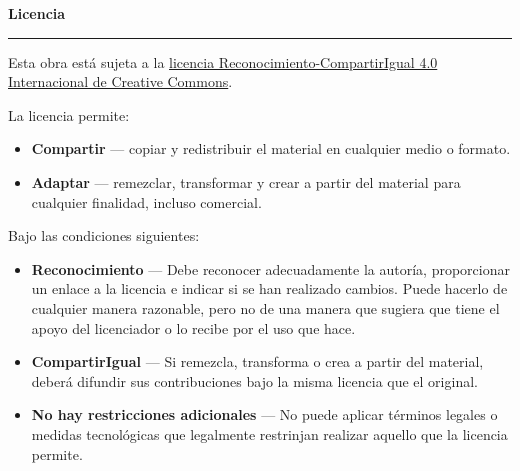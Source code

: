 \thispagestyle{empty}

\hfill

\vfill

\textbf{Licencia} %
\par\vspace*{\dimexpr-\parskip-\baselineskip+6pt}
\noindent\rule{\textwidth}{0.5pt}

Esta obra está sujeta a la \hyperlink{https://creativecommons.org/licenses/by-sa/4.0/legalcode}{licencia Reconocimiento-CompartirIgual 4.0 Internacional de Creative Commons}.

La licencia permite:
\begin{itemize}
	\item[] \textbf{Compartir} --- copiar y redistribuir el material en cualquier medio o formato.
	\item[] \textbf{Adaptar} --- remezclar, transformar y crear a partir del material
para cualquier finalidad, incluso comercial.
\end{itemize}

Bajo las condiciones siguientes:
\begin{itemize}
	\item[] \textbf{Reconocimiento} --- Debe reconocer adecuadamente la autoría, proporcionar un enlace a la licencia e indicar si se han realizado cambios. Puede hacerlo de cualquier manera razonable, pero no de una manera que sugiera que tiene el apoyo del licenciador o lo recibe por el uso que hace. 
	\item[] \textbf{CompartirIgual} --- Si remezcla, transforma o crea a partir del material, deberá difundir sus contribuciones bajo la misma licencia que el original.
	\item[] \textbf{No hay restricciones adicionales} --- No puede aplicar términos legales o medidas tecnológicas que legalmente restrinjan realizar aquello que la licencia permite.
\end{itemize}
\clearpage
